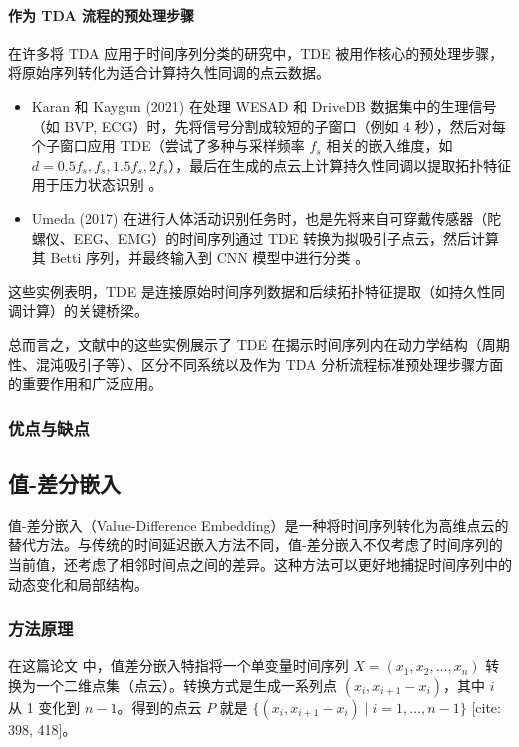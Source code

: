 \paragraph{作为 TDA 流程的预处理步骤}
在许多将 TDA 应用于时间序列分类的研究中，TDE 被用作核心的预处理步骤，将原始序列转化为适合计算持久性同调的点云数据。
\begin{itemize}
    \item Karan 和 Kaygun (2021) 在处理 WESAD 和 DriveDB 数据集中的生理信号（如 BVP, ECG）时，先将信号分割成较短的子窗口（例如 4 秒），然后对每个子窗口应用 TDE（尝试了多种与采样频率 $f_s$ 相关的嵌入维度，如 $d=0.5f_s, f_s, 1.5f_s, 2f_s$），最后在生成的点云上计算持久性同调以提取拓扑特征用于压力状态识别 \cite{Karan2021TSClassificationViaTDA}。
    \item Umeda (2017) 在进行人体活动识别任务时，也是先将来自可穿戴传感器（陀螺仪、EEG、EMG）的时间序列通过 TDE 转换为拟吸引子点云，然后计算其 Betti 序列，并最终输入到 CNN 模型中进行分类 \cite{Umeda2017TSClassificationViaTDA}。
\end{itemize}
这些实例表明，TDE 是连接原始时间序列数据和后续拓扑特征提取（如持久性同调计算）的关键桥梁。

总而言之，文献中的这些实例展示了 TDE 在揭示时间序列内在动力学结构（周期性、混沌吸引子等）、区分不同系统以及作为 TDA 分析流程标准预处理步骤方面的重要作用和广泛应用。


\subsubsection{优点与缺点}

\subsection{值-差分嵌入}
值-差分嵌入（Value-Difference Embedding）是一种将时间序列转化为高维点云的替代方法。与传统的时间延迟嵌入方法不同，值-差分嵌入不仅考虑了时间序列的当前值，还考虑了相邻时间点之间的差异。这种方法可以更好地捕捉时间序列中的动态变化和局部结构。

\subsubsection{方法原理}
在这篇论文 \cite{Yan2024PHTSI} 中，值差分嵌入特指将一个单变量时间序列 \( X = (x_1, x_2, \dots, x_n) \) 转换为一个二维点集（点云）。转换方式是生成一系列点 \( (x_i, x_{i+1} - x_i) \)，其中 \( i \) 从 1 变化到 \( n-1 \)。得到的点云 \( P \) 就是 \( \{ (x_i, x_{i+1} - x_i) \mid i = 1, \dots, n-1 \} \) [cite: 398, 418]。

